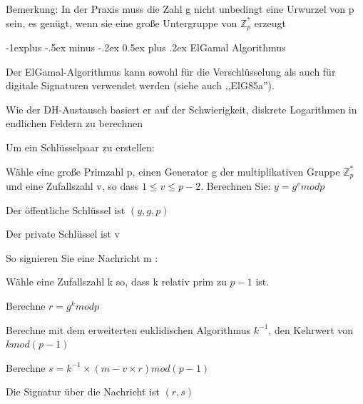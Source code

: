 \documentclass[a4paper]{article}
\makeatletter
\renewcommand{\subsection}{\@startsection{subsection}{2}{0mm}%
 {-1explus -.5ex minus -.2ex}%
 {0.5ex plus .2ex}%
 {\normalfont\normalsize\bfseries}}
\makeatother
\begin{document}
\begin{multicols}{3}
\begin{itemize*}
\begin{itemize*}
\begin{itemize*}
\begin{itemize*}
                        \end{itemize*}
                  \end{itemize*}
            \end{itemize*}
            \item Bemerkung: In der Praxis muss die Zahl g nicht unbedingt eine Urwurzel von p sein, es genügt, wenn sie eine große Untergruppe von $\mathbb{Z}^*_p$ erzeugt
      \end{itemize*}

      \subsection{ElGamal Algorithmus}
      \begin{itemize*}
            \item Der ElGamal-Algorithmus kann sowohl für die Verschlüsselung als auch für digitale Signaturen verwendet werden (siehe auch ,,ElG85a'').
            \item Wie der DH-Austausch basiert er auf der Schwierigkeit, diskrete Logarithmen in endlichen Feldern zu berechnen
            \item Um ein Schlüsselpaar zu erstellen:
            \begin{itemize*}
                  \item Wähle eine große Primzahl p, einen Generator g der multiplikativen Gruppe $\mathbb{Z}^*_p$ und eine Zufallszahl v, so dass $1\leq v\leq p - 2$. Berechnen Sie: $y=g^v mod p$
                  \item Der öffentliche Schlüssel ist $( y, g, p )$
                  \item Der private Schlüssel ist v
            \end{itemize*}
            \item So signieren Sie eine Nachricht m :
            \begin{itemize*}
                  \item Wähle eine Zufallszahl k so, dass k relativ prim zu $p-1$ ist.
                  \item Berechne $r=g^k mod p$
                  \item Berechne mit dem erweiterten euklidischen Algorithmus $k^{-1}$, den Kehrwert von $k mod (p - 1)$
                  \item Berechne $s=k^{-1} \times ( m - v \times r) mod ( p - 1)$
                  \item Die Signatur über die Nachricht ist $( r, s )$
            \end{itemize*}

\end{itemize*}
\end{multicols}
\end{document}

